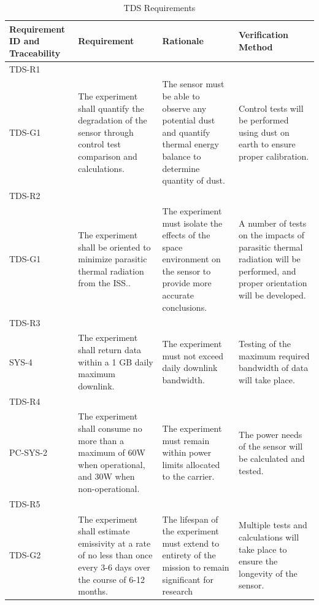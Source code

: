 \documentclass[conf]{new-aiaa}
\begin{document}
\begin{table}[H]
    \centering
    \footnotesize
    \setlength{\tabcolsep}{4pt}
    \renewcommand{\arraystretch}{1.15}
    \begin{tabularx}{\textwidth}{@{}>{\raggedright\arraybackslash}m{2.4cm}YYY@{}}
    \toprule
    \textbf{Requirement ID and Traceability} & \textbf{Requirement} & \textbf{Rationale} & \textbf{Verification Method} \\
    \midrule
    TDS-R1\\TDS-G1 &
    The experiment shall quantify the degradation of the sensor through control test comparison and calculations. &
    The sensor must be able to observe any potential dust and quantify thermal energy balance to determine quantity of dust. &
    Control tests will be performed using dust on earth to ensure proper calibration. \\ \hline

    TDS-R2\\TDS-G1 &
    The experiment shall be oriented to minimize parasitic thermal radiation from the ISS.. &
    The experiment must isolate the effects of the space environment on the sensor to provide more accurate conclusions. &
    A number of tests on the impacts of parasitic thermal radiation will be performed, and proper orientation will be developed. \\ \hline

    TDS-R3\\SYS-4 &
    The experiment shall return data within a 1 GB daily maximum downlink. &
    The experiment must not exceed daily downlink bandwidth. &
    Testing of the maximum required bandwidth of data will take place. \\ \hline

    TDS-R4\\PC-SYS-2 &
    The experiment shall consume no more than a maximum of 60W when operational, and 30W when non-operational. &
    The experiment must remain within power limits allocated to the carrier. &
    The power needs of the sensor will be calculated and tested. \\ \hline

    TDS-R5\\TDS-G2 &
    The experiment shall estimate emissivity at a rate of no less than once every 3-6 days over the course of 6-12 months. &
    The lifespan of the experiment must extend to entirety of the mission to remain significant for research &
    Multiple tests and calculations will take place to ensure the longevity of the sensor. \\
    \bottomrule
    \end{tabularx}
    \caption{TDS Requirements}
    \label{tab:tds_requirements}
\end{table}
\end{document}
